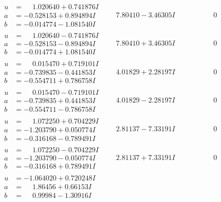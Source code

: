 \documentclass[1p]{elsarticle_modified}
\theoremstyle{definition}
\begin{document}
$$\begin{array}{c|c|c}
\begin{aligned}
u &= \phantom{-}1.020640 + 0.741876 I \\
a &= -0.528153 + 0.894894 I \\
b &= -0.014774 - 1.081540 I\end{aligned}
 & \phantom{-}7.80410 - 3.46305 I & \phantom{-0.000000 } 0 \\ \hline\begin{aligned}
u &= \phantom{-}1.020640 - 0.741876 I \\
a &= -0.528153 - 0.894894 I \\
b &= -0.014774 + 1.081540 I\end{aligned}
 & \phantom{-}7.80410 + 3.46305 I & \phantom{-0.000000 } 0 \\ \hline\begin{aligned}
u &= \phantom{-}0.015470 + 0.719101 I \\
a &= -0.739835 - 0.441853 I \\
b &= -0.554711 + 0.786758 I\end{aligned}
 & \phantom{-}4.01829 + 2.28197 I & \phantom{-0.000000 } 0 \\ \hline\begin{aligned}
u &= \phantom{-}0.015470 - 0.719101 I \\
a &= -0.739835 + 0.441853 I \\
b &= -0.554711 - 0.786758 I\end{aligned}
 & \phantom{-}4.01829 - 2.28197 I & \phantom{-0.000000 } 0 \\ \hline\begin{aligned}
u &= \phantom{-}1.072250 + 0.704229 I \\
a &= -1.203790 + 0.050774 I \\
b &= -0.316168 - 0.789491 I\end{aligned}
 & \phantom{-}2.81137 - 7.33191 I & \phantom{-0.000000 } 0 \\ \hline\begin{aligned}
u &= \phantom{-}1.072250 - 0.704229 I \\
a &= -1.203790 - 0.050774 I \\
b &= -0.316168 + 0.789491 I\end{aligned}
 & \phantom{-}2.81137 + 7.33191 I & \phantom{-0.000000 } 0 \\ \hline\begin{aligned}
u &= -1.064020 + 0.720248 I \\
a &= \phantom{-}1.86456 + 0.66153 I \\
b &= \phantom{-}0.99984 - 1.30916 I\end{aligned}

\end{array}$$
\end{document}
